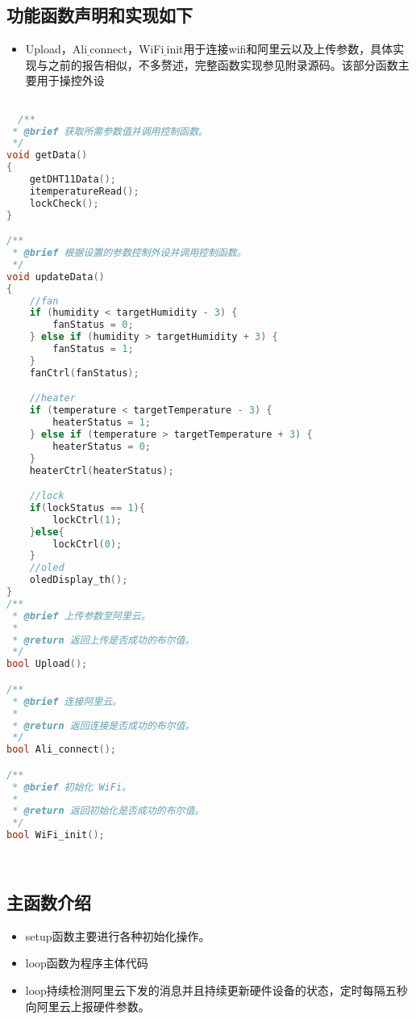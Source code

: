 \documentclass[12pt,hyperref,a4paper,UTF8]{ctexart}
\begin{document}
\subsection*{功能函数声明和实现如下}
\begin{itemize}
  \item Upload，Ali$\underline{}$connect，WiFi$\underline{}$init用于连接wifi和阿里云以及上传参数，具体实现与之前的报告相似，不多赘述，完整函数实现参见附录源码。该部分函数主要用于操控外设
\end{itemize}



\begin{lstlisting}[language=C++]

  /**
 * @brief 获取所需参数值并调用控制函数。
 */
void getData()
{
    getDHT11Data();
    itemperatureRead();
    lockCheck();
}

/**
 * @brief 根据设置的参数控制外设并调用控制函数。
 */
void updateData()
{
    //fan
    if (humidity < targetHumidity - 3) {
        fanStatus = 0;
    } else if (humidity > targetHumidity + 3) {
        fanStatus = 1;
    }
    fanCtrl(fanStatus);

    //heater
    if (temperature < targetTemperature - 3) {
        heaterStatus = 1;
    } else if (temperature > targetTemperature + 3) {
        heaterStatus = 0;
    }
    heaterCtrl(heaterStatus);

    //lock
    if(lockStatus == 1){
        lockCtrl(1);
    }else{
        lockCtrl(0);
    }
    //oled
    oledDisplay_th();
}
/**
 * @brief 上传参数至阿里云。
 * 
 * @return 返回上传是否成功的布尔值。
 */
bool Upload();

/**
 * @brief 连接阿里云。
 * 
 * @return 返回连接是否成功的布尔值。
 */
bool Ali_connect();

/**
 * @brief 初始化 WiFi。
 * 
 * @return 返回初始化是否成功的布尔值。
 */
bool WiFi_init();

  
\end{lstlisting}

\subsection*{主函数介绍}
\begin{itemize}
  \item setup函数主要进行各种初始化操作。
  \item loop函数为程序主体代码
  \item loop持续检测阿里云下发的消息并且持续更新硬件设备的状态，定时每隔五秒向阿里云上报硬件参数。
\end{itemize}
\end{document}
